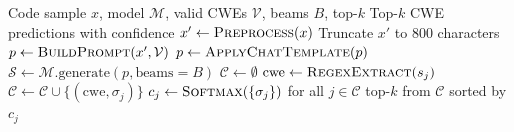 \begin{algorithm}[t]
\caption{Zero-Shot CWE Inference with Beam Search}
\label{alg:zero_shot}
\begin{algorithmic}[1]
\REQUIRE Code sample $x$, model $\mathcal{M}$, valid CWEs
         $\mathcal{V}$, beams $B$, top-$k$
\ENSURE Top-$k$ CWE predictions with confidence
\STATE $x' \leftarrow \textsc{Preprocess}(x)$
\STATE Truncate $x'$ to 800 characters
\STATE $p \leftarrow \textsc{BuildPrompt}(x', \mathcal{V})$
    \STATE $p \leftarrow \textsc{ApplyChatTemplate}(p)$
\ENDIF
\STATE $\mathcal{S} \leftarrow \mathcal{M}.\text{generate}(p,
       \text{beams}\!=\!B)$
\STATE $\mathcal{C} \leftarrow \emptyset$
    \STATE $\text{cwe} \leftarrow \textsc{RegexExtract}(s_j)$
        \STATE $\mathcal{C} \leftarrow \mathcal{C} \cup
               \{(\text{cwe}, \sigma_j)\}$
    \ENDIF
\ENDFOR
\STATE $c_j \leftarrow \textsc{Softmax}(\{\sigma_j\})$ for all
       $j \in \mathcal{C}$
\RETURN top-$k$ from $\mathcal{C}$ sorted by $c_j$
\end{algorithmic}
\end{algorithm}
